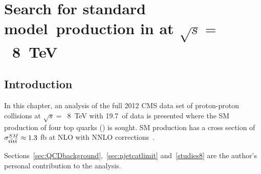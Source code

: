 \chapter{Search for standard model~\tttt production in \runone at $\sqrt{s} =$~8~TeV }
\label{c:Run1}

\section{Introduction}
In this chapter, an analysis of the full 2012 CMS data set of proton-proton collisions at $\sqrt{s} =$~8~TeV with 19.7~\fbinv of data is presented where the SM production of four top quarks (\tttt) is sought. SM \tttt production has a cross section of $\sigma_{{\mathrm{t}\overline{\mathrm{t}}\mathrm{t}\overline{\mathrm{t}}}}^{SM}  \approx 1.3$ fb at NLO with NNLO corrections~\cite{Barger201070,Bevilacqua2012}. 



Sections~\ref{sec:QCDbackground},~\ref{sec:njetcatlimit} and~\ref{studies8} are the author's personal contribution to the analysis.

